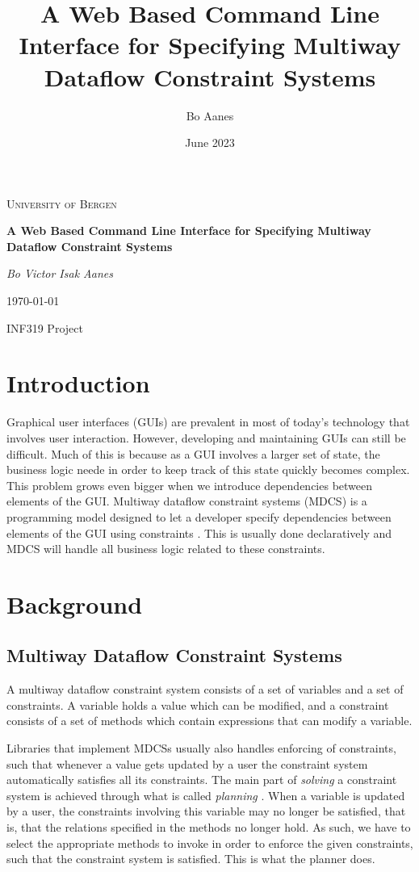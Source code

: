 \documentclass[11pt, a4paper]{article}
\title{A Web Based Command Line Interface for Specifying Multiway Dataflow Constraint Systems}
\author{Bo Aanes}
\date{June 2023}
\begin{document}
\begin{titlepage}
    \centering
    \vspace*{\fill}
    {\scshape\LARGE University of Bergen\par}
    \vspace{1.5cm}
    {\huge\bfseries A Web Based Command Line Interface for Specifying Multiway Dataflow Constraint Systems\par}
    \vspace{2cm}
    {\Large\itshape Bo Victor Isak Aanes\par}
    \vfill
    {\large \today\par}
    \vspace{1cm}
    {\large INF319 Project\par}
    \vfill
\end{titlepage}
\tableofcontents
\clearpage

\section{Introduction}
\label{sec:introduction}
Graphical user interfaces (GUIs) are prevalent in most of today's technology that involves user interaction. However, developing and maintaining GUIs can still be difficult. Much of this is because as a GUI involves a larger set of state, the business logic neede in order to keep track of this state quickly becomes complex. This problem grows even bigger when we introduce dependencies between elements of the GUI. Multiway dataflow constraint systems (MDCS) is a programming model designed to let a developer specify dependencies between elements of the GUI using constraints \cite{semantics}. This is usually done declaratively and MDCS will handle all business logic related to these constraints. 

\section{Background}
\label{sec:background}
\subsection{Multiway Dataflow Constraint Systems}
\label{sec:mdcs}
A multiway dataflow constraint system consists of a set of variables and a set of constraints. A variable holds a value which can be modified, and a constraint consists of a set of methods which contain expressions that can modify a variable.

Libraries that implement MDCSs usually also handles enforcing of constraints, such that whenever a value gets updated by a user the constraint system automatically satisfies all its constraints. The main part of \textit{solving} a constraint system is achieved through what is called \textit{planning} \cite{planners}. When a variable is updated by a user, the constraints involving this variable may no longer be satisfied, that is, that the relations specified in the methods no longer hold. As such, we have to select the appropriate methods to invoke in order to enforce the given constraints, such that the constraint system is satisfied. This is what the planner does.
\end{document}
